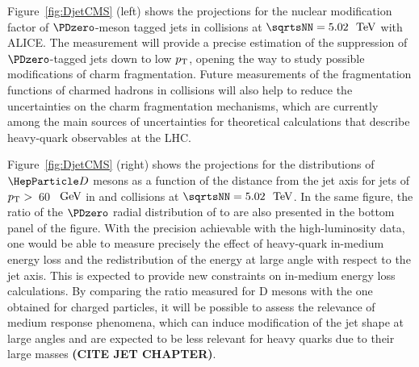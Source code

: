 Figure~\ref{fig:DjetCMS} (left) shows the projections for the nuclear modification factor of $\PDzero$-meson tagged jets in \PbPb collisions at $\sqrtsNN=5.02~{\UTeV}$ with ALICE. The measurement will provide a precise estimation of the suppression of $\PDzero$-tagged jets down to low $p\sb{\scriptstyle\mathrm{T}}$, opening the way to study possible modifications of charm fragmentation. Future measurements of the fragmentation functions of charmed hadrons in \pp collisions will also help to reduce the uncertainties on the charm fragmentation mechanisms, which are currently among the main sources of uncertainties for theoretical calculations that describe heavy-quark observables at the LHC. 

Figure~\ref{fig:DjetCMS} (right) shows the projections for the distributions of $\PD$ mesons as a function of the distance from the jet axis for jets of $p\sb{\scriptstyle\mathrm{T}}>$~60~$~\text{GeV}$ in \pp and \PbPb collisions at $\sqrtsNN=5.02~{\UTeV}$. In the same figure, the ratio of the $\PDzero$ radial distribution of \PbPb to \pp are also presented in the bottom panel of the figure. With the precision achievable with the high-luminosity data, one would be able to measure precisely the effect of heavy-quark in-medium energy loss and the redistribution of the energy at large angle with respect to the jet axis. This is expected to provide new constraints on in-medium energy loss calculations. By comparing the ratio measured for D mesons with the one obtained for charged particles, it will be possible to assess the relevance of medium response phenomena, which can induce modification of the jet shape at large angles and are expected to be less relevant for heavy quarks due to their large masses \textbf{(CITE JET CHAPTER)}.

